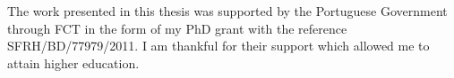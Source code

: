 \clearpage

\vspace*{\fill}
The work presented in this thesis was supported by the Portuguese Government through \gls{FCT} in the form of my PhD grant with the reference SFRH/BD/77979/2011. I am thankful for their support which allowed me to attain higher education.
\vspace*{\fill}

\begin{center}
\end{center}
